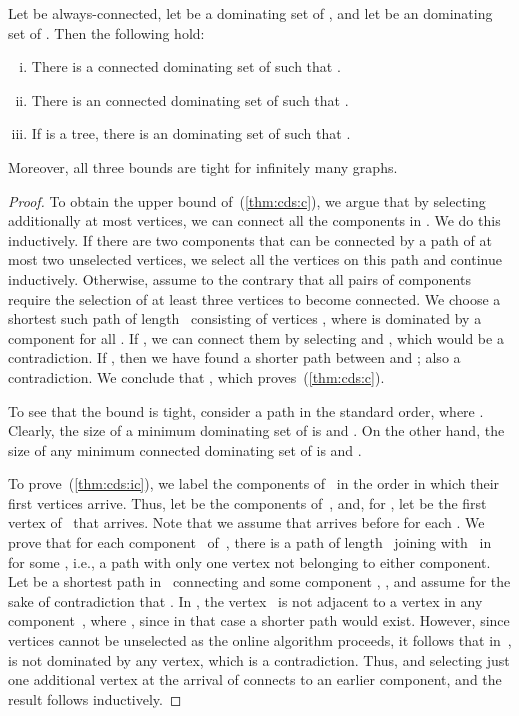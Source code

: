 \begin{theorem}
\label{thm:cds}
Let  be always-connected,
let  be a dominating set of ,
and let  be an \incr dominating set of .
Then the following hold:
\begin{enumerate}[(i)]
\item \label{thm:cds:c} There is a connected dominating set  of 
such that  .
\item \label{thm:cds:ic} There is an 
\incr connected dominating set 
of  such that . 
\item \label{thm:cds:i} If  is a tree, there is an \incr
dominating set  of  such that .
\end{enumerate}
Moreover, all three bounds are tight for infinitely many graphs.
\end{theorem}
\begin{proof}
To obtain the upper bound of~(\ref{thm:cds:c}), we argue that by selecting
additionally at most  vertices, we can connect all the
components in . We do this inductively.  If there are two
components that can be connected by a path of at most two unselected vertices,
we select all the vertices on this path and continue
inductively. Otherwise, assume to the contrary that all pairs of
components require the selection of at least three vertices to become
connected.  We choose a shortest such path of length~ consisting
of vertices , where  is dominated by a
component  for all .  If , we can connect
them by selecting  and , which would be a contradiction.
If , then we have found a shorter path between  and
; also a contradiction.  We conclude that ,
which proves~(\ref{thm:cds:c}).

To see that the bound is tight, consider a path  in the standard order,
where . Clearly, the size of a minimum dominating
set  of  
is  and . On the other hand,
the size of any minimum connected dominating set of  is 
and .

To prove~(\ref{thm:cds:ic}), we label the components of~
in the order in which their first vertices
arrive. Thus, let  be the components of~,
and, for , let
 be the first vertex of~ that arrives. Note that we assume that
 arrives before  for each .
We prove that for each component~ of~,
there is a path of length~
joining  with ~in  for some ,
i.e., a path with only one vertex not belonging to either component.
Let  be a
shortest path in~ connecting  and some component
, , and assume for the sake of contradiction that .
In , the vertex~ is not adjacent to a vertex in any
component~, 
where , since in that case a shorter path would exist.
However, since vertices cannot be unselected as the online algorithm proceeds,
it follows that in~,  is not dominated by any vertex,
which is a contradiction.
Thus,  and selecting just one additional vertex at the arrival of 
connects  to an earlier component,
and the result follows inductively.
 

\end{proof}
